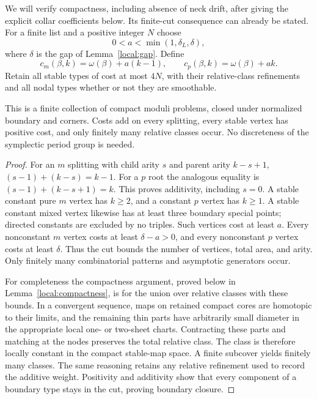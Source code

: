 We will verify compactness, including absence of neck drift, after giving
the explicit collar coefficients below.  Its finite-cut consequence can
already be stated.  For a finite list and a positive integer $N$ choose
\[
 0<a<\min(1,\delta_L,\delta),
\]
where $\delta$ is the gap of Lemma~\ref{local:gap}.  Define
\begin{equation}\label{local:cost}
 c_m(\beta,k)=\omega(\beta)+a(k-1),\qquad
 c_p(\beta,k)=\omega(\beta)+ak.
\end{equation}
Retain all stable types of cost at most $4N$, with their relative-class
refinements and all nodal types whether or not they are smoothable.

\begin{proposition}\label{local:finite}
This is a finite collection of compact moduli problems, closed under
normalized boundary and corners.  Costs add on every splitting, every
stable vertex has positive cost, and only finitely many relative classes
occur.  No discreteness of the symplectic period group is needed.
\end{proposition}
\begin{proof}
For an $m$ splitting with child arity $s$ and parent arity $k-s+1$,
$(s-1)+(k-s)=k-1$.  For a $p$ root the analogous equality is
$(s-1)+(k-s+1)=k$.  This proves additivity, including $s=0$.
A stable constant pure $m$ vertex has $k\geq2$, and a constant $p$
vertex has $k\geq1$.  A stable constant mixed vertex likewise has at
least three boundary special points; directed constants are excluded
by no triples.  Such vertices cost at least $a$.  Every nonconstant
$m$ vertex costs at least $\delta-a>0$, and every nonconstant $p$
vertex costs at least $\delta$.  Thus the cut bounds the number of
vertices, total area, and arity.  Only finitely many combinatorial
patterns and asymptotic generators occur.

For completeness the compactness argument, proved below in
Lemma~\ref{local:compactness}, is for the union over relative classes
with these bounds.  In a convergent sequence, maps on retained compact
cores are homotopic to their limits, and the remaining thin parts
have arbitrarily small diameter in the appropriate local one- or
two-sheet charts.  Contracting these parts and matching at the nodes
preserves the total relative class.  The class is therefore locally
constant in the compact stable-map space.  A finite subcover yields
finitely many classes.  The same reasoning retains any relative
refinement used to record the additive weight.  Positivity and
additivity show that every component of a boundary type stays in the
cut, proving boundary closure.
\end{proof}

